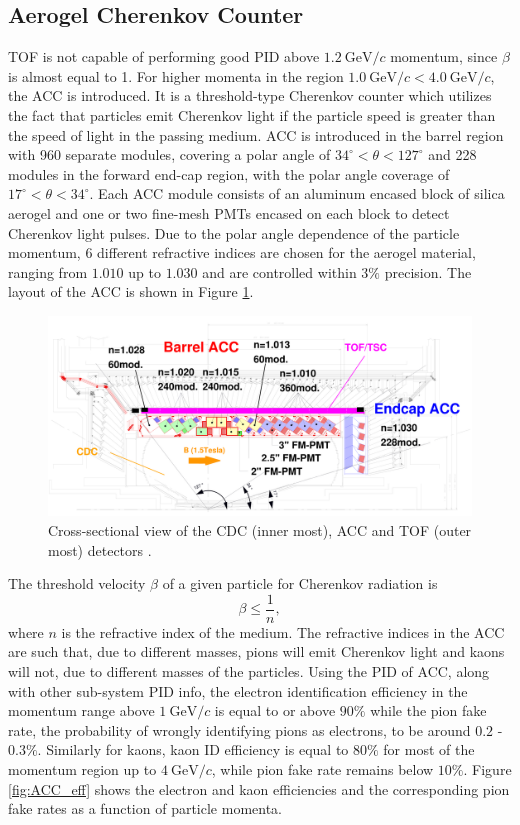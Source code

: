 \documentclass[headings=standardclasses,headings=big,oneside,a4paper,openany,12pt]{scrbook}
\newcommand {\e}[1]{\mathrm{~#1}}
\begin{document}
\subsection{Aerogel Cherenkov Counter}
TOF is not capable of performing good PID above $1.2\e{GeV}/c$ momentum, since $\beta$ is almost equal to 1. For higher momenta in the region $1.0\e{GeV}/c < 4.0\e{GeV}/c$, the ACC is introduced. It is a threshold-type Cherenkov counter which utilizes the fact that particles emit Cherenkov light if the particle speed is greater than the speed of light in the passing medium. ACC is introduced in the barrel region with 960 separate modules, covering a polar angle of $34^\circ < \theta < 127^\circ$ and 228 modules in the forward end-cap region, with the polar angle coverage of $17^\circ < \theta < 34^\circ$. Each ACC module consists of an aluminum encased block of silica aerogel and one or two fine-mesh PMTs encased on each block to detect Cherenkov light pulses. Due to the polar angle dependence of the particle momentum, 6 different refractive indices are chosen for the aerogel material, ranging from $1.010$ up to $1.030$ and are controlled within $3\%$ precision. The layout of the ACC is shown in Figure \ref{fig:ACC_layout}.
\begin{figure}[H]
	\centering
	\captionsetup{width=0.8\linewidth}
	\includegraphics[width=\linewidth]{fig/setup/ACC_layout}
	\caption{Cross-sectional view of the CDC (inner most), ACC and TOF (outer most) detectors \cite{ABASHIAN2002117}.}
	\label{fig:ACC_layout}
\end{figure}
The threshold velocity $\beta$ of a given particle for Cherenkov radiation is
\begin{equation}
\beta \leq \frac{1}{n},
\end{equation}
where $n$ is the refractive index of the medium. The refractive indices in the ACC are such that, due to different masses, pions will emit Cherenkov light and kaons will not, due to different masses of the particles. Using the PID of ACC, along with other sub-system PID info, the electron identification efficiency in the momentum range above $1\e{GeV}/c$ is equal to or above $90\%$ while the pion fake rate, the probability of wrongly identifying pions as electrons, to be around $0.2$ - $0.3\%$. Similarly for kaons, kaon ID efficiency is equal to $80\%$ for most of the momentum region up to $4\e{GeV}/c$, while pion fake rate remains below $10\%$. Figure \ref{fig:ACC_eff} shows the electron and kaon efficiencies and the corresponding pion fake rates as a function of particle momenta.
\end{document}
